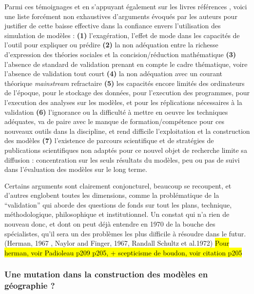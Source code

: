 Parmi ces témoignages et en s'appuyant également sur les livres références \autocite{Naylor1966,Guetzkow1972,Dutton1971}, voici une liste forcément non exhaustives d'arguments évoqués par les auteurs pour justifier de cette baisse effective dans la confiance envers l'utilisation des simulation de modèles : \textbf{(1)} l'exagération, l'effet de mode dans les capacités de l'outil pour expliquer ou prédire \textbf{(2)} la non adéquation entre la richesse d'expression des théories sociales et la concision/réduction mathématique \textbf{(3)} l'absence de standard de validation prenant en compte le cadre thématique, voire l'absence de validation tout court \textbf{(4)} la non adéquation avec un courant théorique \textit{mainstream} refractaire \textbf{(5)} les capacités encore limités des ordinateurs de l'époque, pour le stockage des données, pour l'execution des programmes, pour l'execution des analyses sur les modèles, et pour les réplications nécessaires à la validation \textbf{(6)} l'ignorance ou la difficulté à mettre en oeuvre les techniques adéquates, va de paire avec le manque de formation/compétence pour ces nouveaux outils dans la discipline, et rend difficile l'exploitation et la construction des modèles \textbf{(7)} l'existence de parcours scientifique et de stratégies de publications scientifiques non adaptés pour ce nouvel objet de recherche limite sa diffusion : concentration sur les seuls résultats du modèles, peu ou pas de suivi dans l'évaluation des modèles sur le long terme.

Certains arguments sont clairement conjoncturel, beaucoup se recoupent, et d'autres englobent toutes les dimensions, comme la problématique de la \enquote{validation} qui aborde des questions de fonds sur tout les plans, technique, méthodologique, philosophique et institutionnel. Un constat qui n'a rien de nouveau donc, et dont on peut déjà entendre en 1970 de la bouche des spécialistes, qu'il sera un des problèmes les plus difficile à résoudre dans le futur. (Herman, 1967 , Naylor and Finger, 1967, Randall Schultz et al.1972)  \hl{Pour herman, voir Padioleau p209 p205, + scepticisme de boudon, voir citation p205}


\subsubsection{Une mutation dans la construction des modèles en géographie ?}
\label{ssec:crise_mutation}

